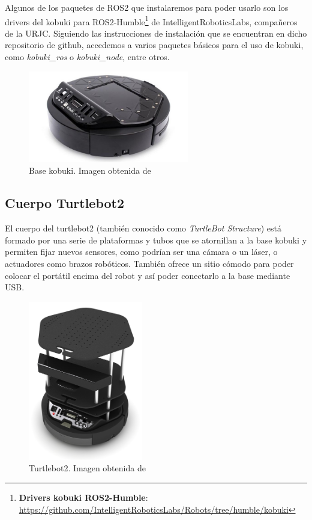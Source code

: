 Algunos de los paquetes de ROS2 que instalaremos para poder usarlo son los drivers del kobuki para
ROS2-Humble\footnote{\textbf{Drivers kobuki ROS2-Humble}: \url{https://github.com/IntelligentRoboticsLabs/Robots/tree/humble/kobuki}} de IntelligentRoboticsLabs,
compañeros de la URJC. Siguiendo las instrucciones de instalación que se encuentran en dicho repositorio de github, accedemos a varios paquetes básicos
para el uso de kobuki, como \textit{kobuki\_ros} o \textit{kobuki\_node}, entre otros.

\begin{figure} [H]
    \begin{center}
        \includegraphics[width=7cm]{figs/c3/kobuki_base.jpg}
    \end{center}
    \caption[Kobuki base]{Base kobuki. Imagen obtenida de \cite{kobuki_base}}
    \label{fig:kobuki_base}
\end{figure}

\subsection{Cuerpo Turtlebot2}
\label{subsec:turtlebot2_body}
El cuerpo del turtlebot2 (también conocido como \textit{TurtleBot Structure}) está formado por una serie de plataformas y tubos que se atornillan a la
base kobuki y permiten fijar nuevos sensores, como podrían ser una cámara o un láser, o actuadores como brazos robóticos. También ofrece un sitio cómodo
para poder colocar el portátil encima del robot y así poder conectarlo a la base mediante USB. 


\begin{figure} [H]
    \begin{center}
        \includegraphics[width=5cm]{figs/c3/turtlebot2_body.jpg}
    \end{center}
    \caption[Turtlebot2]{Turtlebot2. Imagen obtenida de \cite{turtlebot_2_structure}}
    \label{fig:turtlebot_2_structure}
\end{figure}

